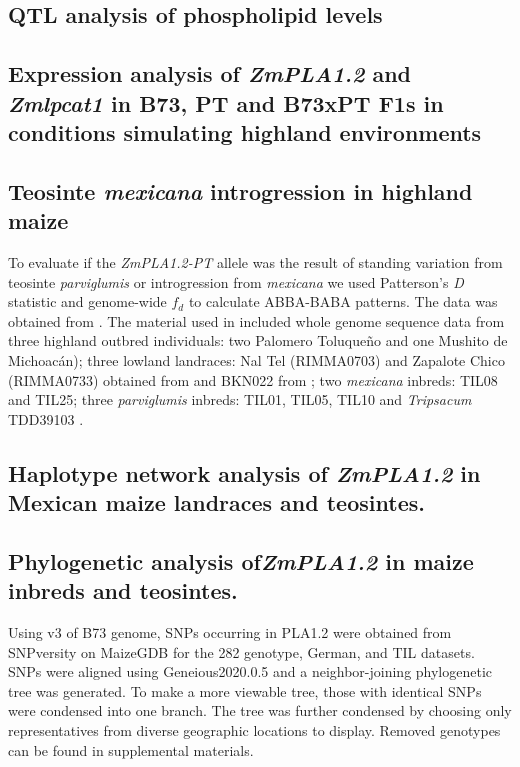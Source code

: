 \documentclass[9pt,twocolumn,twoside]{BioRxiv}
\begin{document}
\subsection{QTL analysis of phospholipid levels}

\subsection{Expression analysis of \textit{ZmPLA1.2} and \textit{Zmlpcat1} in B73, PT and B73xPT F1s in conditions simulating highland environments}

\subsection{Teosinte \textit{mexicana} introgression in highland maize}
To evaluate if the \textit{ZmPLA1.2-PT} allele was the result of standing variation from teosinte \textit{parviglumis} or introgression from \textit{mexicana} we used Patterson's \textit{D} statistic and genome-wide $f_{d}$ to calculate ABBA-BABA patterns. 
The data was obtained from \cite{Gonzalez-Segovia2019-jy}. 
The material used in \cite{Gonzalez-Segovia2019-jy} included whole genome sequence data from three highland outbred individuals: two Palomero Toluqueño and one Mushito de Michoacán); three lowland landraces: Nal Tel (RIMMA0703) and Zapalote Chico (RIMMA0733) obtained from \cite{Wang2017-bc} and  BKN022 from \cite{Bukowski2017-ng}; two \textit{mexicana} inbreds: TIL08 and TIL25; three \textit{parviglumis} inbreds: TIL01, TIL05, TIL10 and \textit{Tripsacum} TDD39103 \cite{Bukowski2017-ng}. 

\subsection{Haplotype network analysis of \textit{ZmPLA1.2} in Mexican maize landraces and teosintes.}


\subsection{Phylogenetic analysis of\textit{ZmPLA1.2} in maize inbreds and teosintes.}
Using v3 of B73 genome, SNPs occurring in PLA1.2 were obtained from SNPversity on MaizeGDB for the 282 genotype, German, and TIL datasets. SNPs were aligned using Geneious2020.0.5 and a neighbor-joining phylogenetic tree was generated. To make a more viewable tree, those with identical SNPs were condensed into one branch. The tree was further condensed by choosing only representatives from diverse geographic locations to display. Removed genotypes can be found in supplemental materials. 
\end{document}
